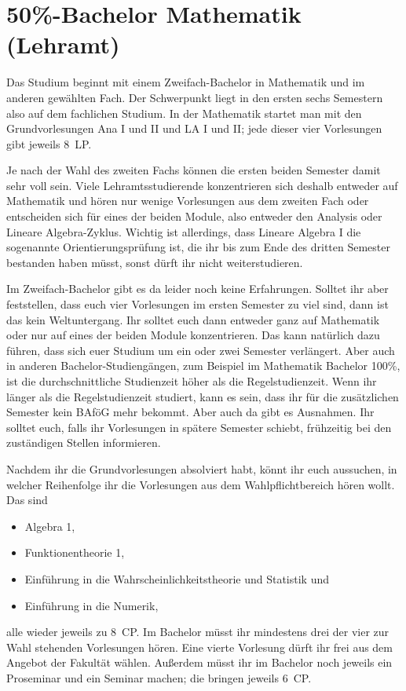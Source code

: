 \section{50\%-Bachelor Mathematik (Lehramt)}

Das Studium beginnt mit einem Zweifach-Bachelor in Mathematik und im anderen
gewählten Fach. Der Schwerpunkt liegt in den ersten sechs Semestern also auf
dem fachlichen Studium. In der Mathematik startet man mit den Grundvorlesungen
Ana I und II und LA I und II; jede dieser vier Vorlesungen gibt jeweils 8~LP.

Je nach der Wahl des zweiten Fachs können die ersten beiden Semester damit sehr
voll sein. Viele Lehramtsstudierende konzentrieren sich deshalb entweder auf
Mathematik und hören nur wenige Vorlesungen aus dem zweiten Fach oder
entscheiden sich für eines der beiden Module, also entweder den Analysis oder
Lineare Algebra-Zyklus. Wichtig ist allerdings, dass Lineare Algebra I die
sogenannte Orientierungsprüfung ist, die ihr bis zum Ende des dritten Semester
bestanden haben müsst, sonst dürft ihr nicht weiterstudieren.

Im Zweifach-Bachelor gibt es da leider noch keine Erfahrungen. Solltet ihr
aber feststellen, dass euch vier Vorlesungen im ersten Semester zu viel sind,
dann ist das kein Weltuntergang. Ihr solltet euch dann entweder ganz auf
Mathematik oder nur auf eines der beiden Module konzentrieren. Das kann
natürlich dazu führen, dass sich euer Studium um ein oder zwei Semester
verlängert. Aber auch in anderen Bachelor-Studiengängen, zum Beispiel im
Mathematik Bachelor 100\%, ist die durchschnittliche Studienzeit höher als die
Regelstudienzeit.  Wenn ihr länger als die Regelstudienzeit studiert, kann es
sein, dass ihr für die zusätzlichen Semester kein BAföG mehr bekommt. Aber auch
da gibt es Ausnahmen.  Ihr solltet euch, falls ihr Vorlesungen in spätere
Semester schiebt, frühzeitig bei den zuständigen Stellen informieren.

Nachdem ihr die Grundvorlesungen absolviert habt, könnt ihr euch aussuchen, in
welcher Reihenfolge ihr die Vorlesungen aus dem Wahlpflichtbereich hören
wollt. Das sind
\begin{itemize}
  \item Algebra 1,
  \item Funktionentheorie 1,
  \item Einführung in die Wahrscheinlichkeitstheorie und Statistik und
  \item Einführung in die Numerik,
\end{itemize}
alle wieder jeweils zu 8~CP. Im Bachelor müsst ihr mindestens drei der vier zur
Wahl stehenden Vorlesungen hören. Eine vierte Vorlesung  dürft ihr frei aus dem
Angebot der Fakultät wählen. Außerdem müsst ihr im Bachelor noch jeweils ein
Proseminar und ein Seminar machen; die bringen jeweils 6~CP.

